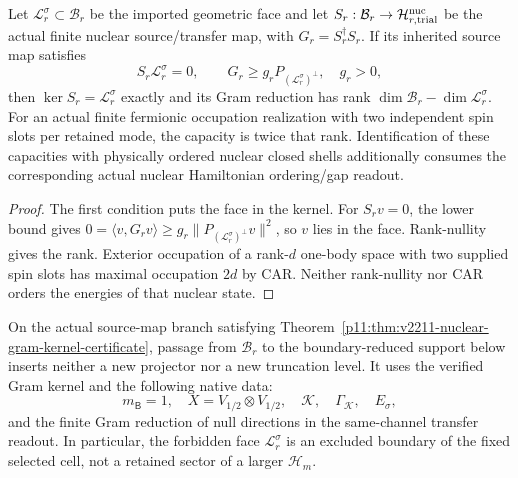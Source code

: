 \documentclass[12pt,a4paper]{article}
\begin{document}
\begin{theorem}
\label{p11:thm:v2211-nuclear-gram-kernel-certificate}
Let $\mathcal L_r^\sigma\subset\mathcal B_r$ be the imported geometric
face and let $S_r:\mathcal B_r\to\mathcal H_{r,\rm trial}^{\rm nuc}$
be the actual finite nuclear source/transfer map, with $G_r=S_r^\dagger S_r$.
If its inherited source map satisfies
\[
 S_r\mathcal L_r^\sigma=0,\qquad
 G_r\ge g_r P_{(\mathcal L_r^\sigma)^\perp},\quad g_r>0,
\]
then $\ker S_r=\mathcal L_r^\sigma$ exactly and its Gram reduction has
rank $\dim\mathcal B_r-\dim\mathcal L_r^\sigma$.
For an actual finite fermionic occupation realization with two independent
spin slots per retained mode, the capacity is twice that rank. Identification
of these capacities with physically ordered nuclear closed shells additionally
consumes the corresponding actual nuclear Hamiltonian ordering/gap readout.
\end{theorem}
\begin{proof}
The first condition puts the face in the kernel. For $S_rv=0$, the lower
bound gives $0=\langle v,G_rv\rangle\ge
g_r\|P_{(\mathcal L_r^\sigma)^\perp}v\|^2$, so $v$ lies in the face.
Rank-nullity gives the rank. Exterior occupation of a rank-$d$ one-body
space with two supplied spin slots has maximal occupation $2d$ by CAR.
Neither rank-nullity nor CAR orders the energies of that nuclear state.
\end{proof}

\begin{proposition}
\label{p11:prop:no-insertion-status-coordinate-boundary}
On the actual source-map branch satisfying
Theorem~\ref{p11:thm:v2211-nuclear-gram-kernel-certificate}, passage from
$\mathcal B_r$ to the boundary-reduced support below inserts neither a new
projector nor a new truncation level. It uses the verified Gram kernel and
the following native data:
\[
        m_{\mathsf B}=1,
        \quad
        X=V_{1/2}\otimes V_{1/2},
        \quad
        \mathcal K,
        \quad
        \Gamma_{\mathcal K},
        \quad
        E_\sigma,
\]
and the finite Gram reduction of null directions in the same-channel transfer readout.  In particular, the forbidden face \(\mathcal L_r^\sigma\) is an excluded boundary of the fixed selected cell, not a retained sector of a larger \(\mathcal H_m\).
\end{proposition}
\end{document}
